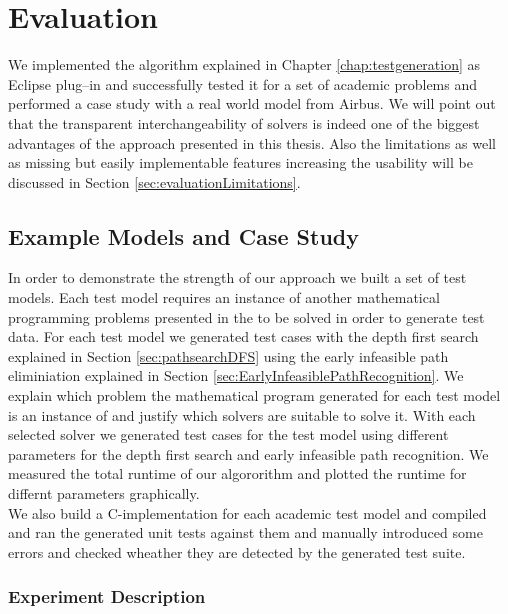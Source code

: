 \chapter{Evaluation}
\label{chap:evaluation}
We implemented the algorithm explained in Chapter \ref{chap:testgeneration} as Eclipse plug--in and successfully tested it for a set of academic problems and performed a case study with a real world model from Airbus. We will point out that the transparent interchangeability of solvers is indeed one of the biggest advantages of the approach presented in this thesis. Also the limitations as well as missing but easily implementable features increasing the usability will be discussed in Section \ref{sec:evaluationLimitations}.\\
\section{Example Models and Case Study}
In order to demonstrate the strength of our approach we built a set of test models. Each test model requires an instance of another mathematical programming problems presented in the  to be solved in order to generate test data. For each test model we generated test cases with the depth first search explained in Section \ref{sec:pathsearchDFS} using the early infeasible path eliminiation explained in Section \ref{sec:EarlyInfeasiblePathRecognition}. We explain which problem the mathematical program generated for each test model is an instance of and justify which solvers are suitable to solve it. With each selected solver we generated test cases for the test model using different parameters for the depth first search and early infeasible path recognition. We measured the total runtime of our algororithm and plotted the runtime for differnt parameters graphically.\\
We also build a C-implementation for each academic test model and compiled and ran the generated unit tests against them and manually introduced some errors and checked wheather they are detected by the generated test suite.
\subsection{Experiment Description}
